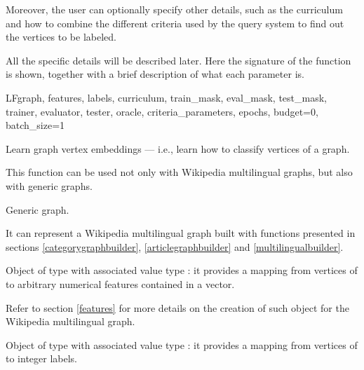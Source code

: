             Moreover, the user can optionally specify other details, such as the curriculum and how to combine the different criteria used by the query system to find out the vertices to be labeled.
            
            All the specific details will be described later. Here the signature of the function is shown, together with a brief description of what each parameter is.
            \begin{independentfunctiondoc}{LF}{graph, features, labels, curriculum, train\_mask, eval\_mask, test\_mask, trainer, evaluator, tester, oracle, criteria\_parameters, epochs, budget=0, batch\_size=1}
                \begin{functiondescription}
                    Learn graph vertex embeddings --- i.e., learn how to classify vertices of a graph.
                    
                    This function can be used not only with Wikipedia multilingual graphs, but also with generic graphs.
                \end{functiondescription}
                
                \begin{functionparameters}
                    \item[graph] 
                    
                    Generic graph.
                    
                    It can represent a Wikipedia multilingual graph built with functions presented in sections \ref{categorygraphbuilder}, \ref{articlegraphbuilder} and \ref{multilingualbuilder}.
                    \item[features] 
                    
                    Object of type  with associated value type : it provides a mapping from vertices of  \normalfont to arbitrary numerical features contained in a vector.
                    
                    Refer to section \ref{features} for more details on the creation of such object for the Wikipedia multilingual graph.
                    \item[labels] 
                    
                    Object of type  with associated value type : it provides a mapping from vertices of  \normalfont to integer labels.
                    

\end{functionparameters}
\end{independentfunctiondoc}
